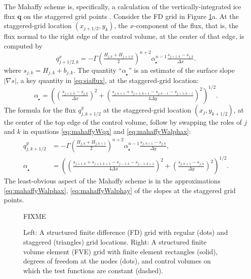 \documentclass[11pt]{amsart}
\newcommand\bq{\mathbf{q}}
\newcommand{\grad}{\nabla}
\newcommand\alpharight{\alpha_{{}_{\blacktriangleright}}}
\newcommand\alphaup{\alpha_{{\!}_{\blacktriangle}}}
\begin{document}
The Mahaffy scheme is, specifically, a calculation of the vertically-integrated ice flux $\bq$ on the staggered grid points \cite[equations (19), (20)]{Mahaffy1976}.  Consider the FD grid in Figure \ref{fig:fdfemgrids}a.  At the staggered-grid location $(x_{j+1/2},y_k)$, the $x$-component of the flux, that is, the flux normal to the right edge of the control volume, at the center of that edge, is computed by
\begin{equation}
q^x_{j+1/2,k} = - \Gamma \left(\tfrac{H_{j,k} + H_{j+1,k}}{2}\right)^{n+2} \alpharight^{n-1} \tfrac{s_{j+1,k} - s_{j,k}}{\Delta x}.  \label{eq:mahaffyWqx}
\end{equation}
where $s_{j,k} = H_{j,k} + b_{j,k}$.  The quantity ``$\alpharight$'' is an estimate of the surface slope $|\grad s|$, a key quantity in \eqref{eq:siaflux}, at the staggered-grid location:
\begin{equation}
\alpharight = \left(\left(\tfrac{s_{j+1,k} - s_{j,k}}{\Delta x}\right)^2 + \left(\tfrac{s_{j,k+1} + s_{j+1,k+1} - s_{j,k-1} - s_{j+1,k-1}}{4 \Delta y}\right)^2\right)^{1/2}.  \label{eq:mahaffyWalphax}
\end{equation}
The formula for the flux $q^y_{j,k+1/2}$ at the staggered-grid location $(x_j,y_{k+1/2})$, at the center of the top edge of the control volume, follow by swapping the roles of $j$ and $k$ in equations \eqref{eq:mahaffyWqx} and \eqref{eq:mahaffyWalphax}:
\begin{align}
q^y_{j,k+1/2} &= - \Gamma \left(\tfrac{H_{j,k} + H_{j,k+1}}{2}\right)^{n+2} \alphaup^{n-1} \tfrac{s_{j,k+1} - s_{j,k}}{\Delta y}, \label{eq:mahaffyWqy} \\
\alphaup &= \left(\left(\tfrac{s_{j+1,k} + s_{j+1,k+1} - s_{j-1,k} - s_{j-1,k+1}}{4 \Delta x}\right)^2 + \left(\tfrac{s_{j,k+1} - s_{j,k}}{\Delta y}\right)^2\right)^{1/2}.  \label{eq:mahaffyWalphay}
\end{align}
The least-obvious aspect of the Mahaffy scheme is in the approximations \eqref{eq:mahaffyWalphax}, \eqref{eq:mahaffyWalphay} of the slopes at the staggered grid points.

\begin{figure}[ht]
\begin{center}
FIXME
\end{center}
\caption{Left: A structured finite difference (FD) grid with regular (dots) and staggered (triangles) grid locations.  Right: A structured finite volume element (FVE) grid with finite element rectangles (solid), degrees of freedom at the nodes (dots), and control volumes on which the test functions are constant (dashed).}
\label{fig:fdfemgrids}
\end{figure}
\end{document}
